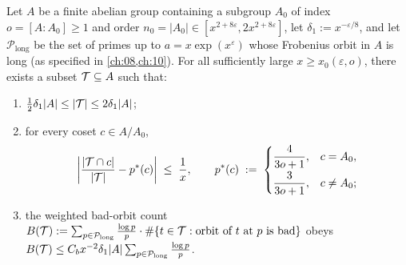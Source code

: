 \begin{proposition}
\label{prop:04:tops}
Let $A$ be a finite abelian group containing a subgroup $A_0$ of index $o = [A : A_0] \ge 1$ and order $n_0 = |A_0| \in [x^{2+8\varepsilon}, 2x^{2+8\varepsilon}]$, let $\delta_1 := x^{-\varepsilon/8}$, and let $\mathcal{P}_{\mathrm{long}}$ be the set of primes up to $a = x\exp(x^\varepsilon)$ whose Frobenius orbit in $A$ is long (as specified in \cref{ch:08,ch:10}). For all sufficiently large $x \ge x_0(\varepsilon, o)$, there exists a subset $\mathcal{T} \subseteq A$ such that:
\begin{enumerate}[label=\textup{(\roman*)}]
\item $\frac{1}{2}\delta_1 |A| \le |\mathcal{T}| \le 2\delta_1 |A|$;
\item for every coset $c \in A / A_0$,
  \begin{equation}
  \label{eq:04:coset-shares}
    \left|\frac{|\mathcal{T} \cap c|}{|\mathcal{T}|} - p^*(c)\right| \;\le\; \frac{1}{x}, \qquad
    p^*(c) \;:=\; \begin{cases} \dfrac{4}{3o + 1}, & c = A_0, \\[6pt] \dfrac{3}{3o + 1}, & c \neq A_0; \end{cases}
  \end{equation}
\item the weighted bad-orbit count $B(\mathcal{T}) := \sum_{p \in \mathcal{P}_{\mathrm{long}}} \frac{\log p}{p} \cdot \#\{t \in \mathcal{T} : \text{orbit of } t \text{ at } p \text{ is bad}\}$ obeys $B(\mathcal{T}) \le C_b x^{-2}\delta_1 |A| \sum_{p \in \mathcal{P}_{\mathrm{long}}} \frac{\log p}{p}$.
\end{enumerate}
\end{proposition}

